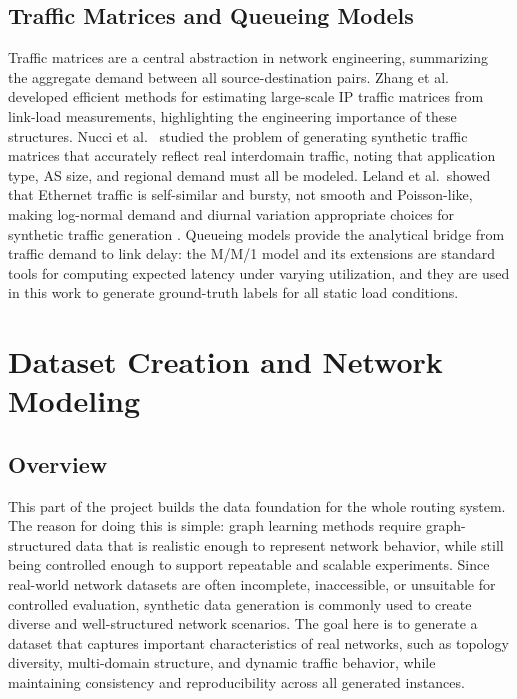 \documentclass[12pt]{article}
\begin{document}
\subsection{Traffic Matrices and Queueing Models}
Traffic matrices are a central abstraction in network engineering, summarizing the aggregate demand between all source-destination pairs. Zhang et al.\ \cite{internetTrafficMatrices} developed efficient methods for estimating large-scale IP traffic matrices from link-load measurements, highlighting the engineering importance of these structures. Nucci et al.\ \cite{itmgen} studied the problem of generating synthetic traffic matrices that accurately reflect real interdomain traffic, noting that application type, AS size, and regional demand must all be modeled. Leland et al.\ showed that Ethernet traffic is self-similar and bursty, not smooth and Poisson-like, making log-normal demand and diurnal variation appropriate choices for synthetic traffic generation \cite{ethernetTraffic}. Queueing models provide the analytical bridge from traffic demand to link delay: the M/M/1 model \cite{mm1} and its extensions \cite{queueDelay} are standard tools for computing expected latency under varying utilization, and they are used in this work to generate ground-truth labels for all static load conditions.

\section{Dataset Creation and Network Modeling}
\label{sec:features}

\subsection{Overview}
This part of the project builds the data foundation for the whole routing system. The reason for doing this is simple: graph learning methods require graph-structured data that is realistic enough to represent network behavior, while still being controlled enough to support repeatable and scalable experiments. Since real-world network datasets are often incomplete, inaccessible, or unsuitable for controlled evaluation, synthetic data generation is commonly used to create diverse and well-structured network scenarios. The goal here is to generate a dataset that captures important characteristics of real networks, such as topology diversity, multi-domain structure, and dynamic traffic behavior, while maintaining consistency and reproducibility across all generated instances.
\end{document}
